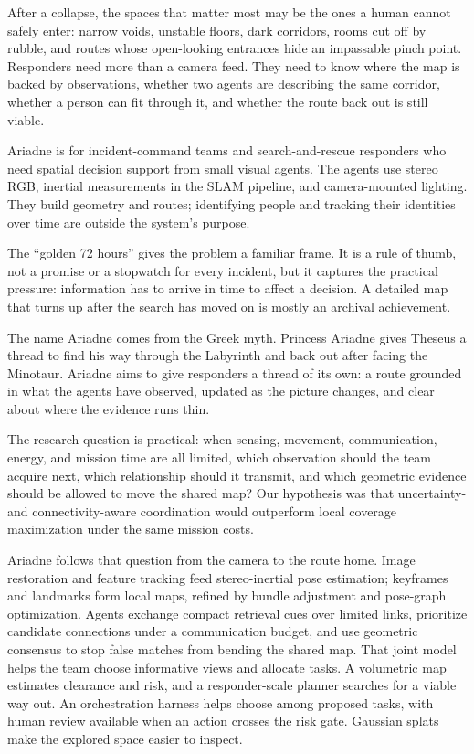 \documentclass[10pt,a4paper]{article}
\begin{document}
After a collapse, the spaces that matter most may be the ones a human cannot safely enter: narrow voids, unstable floors, dark corridors, rooms cut off by rubble, and routes whose open-looking entrances hide an impassable pinch point. Responders need more than a camera feed. They need to know where the map is backed by observations, whether two agents are describing the same corridor, whether a person can fit through it, and whether the route back out is still viable.

Ariadne is for incident-command teams and search-and-rescue responders who need spatial decision support from small visual agents. The agents use stereo RGB, inertial measurements in the SLAM pipeline, and camera-mounted lighting. They build geometry and routes; identifying people and tracking their identities over time are outside the system’s purpose.

The “golden 72 hours” gives the problem a familiar frame. It is a rule of thumb, not a promise or a stopwatch for every incident, but it captures the practical pressure: information has to arrive in time to affect a decision. A detailed map that turns up after the search has moved on is mostly an archival achievement.

The name Ariadne comes from the Greek myth. Princess Ariadne gives Theseus a thread to find his way through the Labyrinth and back out after facing the Minotaur. Ariadne aims to give responders a thread of its own: a route grounded in what the agents have observed, updated as the picture changes, and clear about where the evidence runs thin.

The research question is practical: when sensing, movement, communication, energy, and mission time are all limited, which observation should the team acquire next, which relationship should it transmit, and which geometric evidence should be allowed to move the shared map? Our hypothesis was that uncertainty- and connectivity-aware coordination would outperform local coverage maximization under the same mission costs.

Ariadne follows that question from the camera to the route home. Image restoration and feature tracking feed stereo-inertial pose estimation; keyframes and landmarks form local maps, refined by bundle adjustment and pose-graph optimization. Agents exchange compact retrieval cues over limited links, prioritize candidate connections under a communication budget, and use geometric consensus to stop false matches from bending the shared map. That joint model helps the team choose informative views and allocate tasks. A volumetric map estimates clearance and risk, and a responder-scale planner searches for a viable way out. An orchestration harness helps choose among proposed tasks, with human review available when an action crosses the risk gate. Gaussian splats make the explored space easier to inspect.
\end{document}
